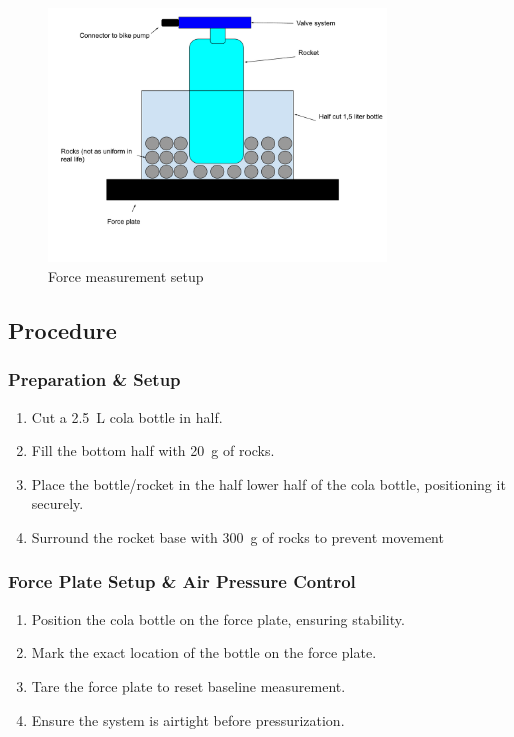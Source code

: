 \documentclass[12pt,a4paper]{article}
\begin{document}
\begin{figure}[H]
\centering
\includegraphics[width=0.8\textwidth]{measuring force.pdf}
\caption{Force measurement setup}
\label{fig:measuring_force}
\end{figure}

\subsection{Procedure}

\subsubsection{Preparation \& Setup}
\begin{enumerate}
\item Cut a \SI{2.5}{\liter} cola bottle in half.
\item Fill the bottom half with \SI{20}{\gram} of rocks.
\item Place the bottle/rocket in the half lower half of the cola bottle, positioning it securely.
\item Surround the rocket base with \SI{300}{\gram} of rocks to prevent movement
\end{enumerate}

\subsubsection{Force Plate Setup \& Air Pressure Control}
\begin{enumerate}
\item Position the cola bottle on the force plate, ensuring stability.
\item Mark the exact location of the bottle on the force plate.
\item Tare the force plate to reset baseline measurement.
\item Ensure the system is airtight before pressurization.
\end{enumerate}
\end{document}
